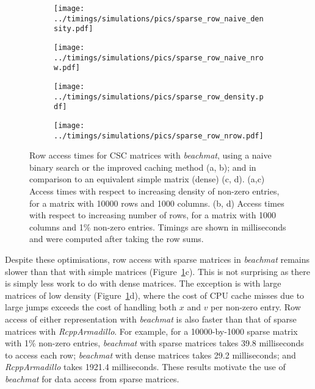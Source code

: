 \documentclass[10pt,letterpaper]{article}
\newcommand{\beachmat}{\textit{beachmat}}
\begin{document}

\begin{figure}[btp]
    \begin{subfigure}[b]{0.49\textwidth}
        \texttt{[image: ../timings/simulations/pics/sparse\_row\_naive\_density.pdf]}
        \caption{}
    \end{subfigure}
    \begin{subfigure}[b]{0.49\textwidth}
        \texttt{[image: ../timings/simulations/pics/sparse\_row\_naive\_nrow.pdf]}
        \caption{}
    \end{subfigure}
    \begin{subfigure}[b]{0.49\textwidth}
        \texttt{[image: ../timings/simulations/pics/sparse\_row\_density.pdf]}
        \caption{}
    \end{subfigure}
    \begin{subfigure}[b]{0.49\textwidth}
        \texttt{[image: ../timings/simulations/pics/sparse\_row\_nrow.pdf]}
        \caption{}
    \end{subfigure}
    \caption{Row access times for CSC matrices with \beachmat{}, using a naive binary search or the improved caching method (a, b); and in comparison to an equivalent simple matrix (dense) (c, d).
        (a,c) Access times with respect to increasing density of non-zero entries, for a matrix with 10000 rows and 1000 columns.
        (b, d) Access times with respect to increasing number of rows, for a matrix with 1000 columns and 1\% non-zero entries.
        Timings are shown in milliseconds and were computed after taking the row sums. 
    }
    \label{fig:sparserow}
\end{figure}


Despite these optimisations, row access with sparse matrices in \beachmat{} remains slower than that with simple matrices (Figure~\ref{fig:sparserow}c).
This is not surprising as there is simply less work to do with dense matrices.
The exception is with large matrices of low density (Figure~\ref{fig:sparserow}d), where the cost of CPU cache misses due to large jumps exceeds the cost of handling both $x$ and $v$ per non-zero entry.
Row access of either representation with \beachmat{} is also faster than that of sparse matrices with \textit{RcppArmadillo}.
For example, for a 10000-by-1000 sparse matrix with 1\% non-zero entries, \beachmat{} with sparse matrices takes 39.8 milliseconds to access each row; \beachmat{} with dense matrices takes 29.2 milliseconds; and \textit{RcppArmadillo} takes 1921.4 milliseconds.
These results motivate the use of \beachmat{} for data access from sparse matrices.
\end{document}
